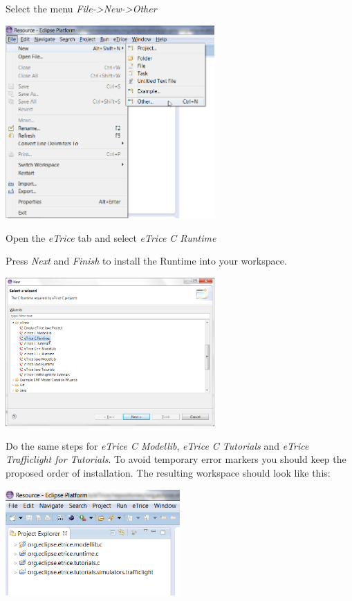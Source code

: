 Select the menu \emph{File->New->Other}

\includegraphics[width=0.6\textwidth]{images/013-SetupWorkspace02.png}

Open the \emph{eTrice} tab and select \textit{eTrice C Runtime}

Press \emph{Next} and \emph{Finish} to install the Runtime into your workspace.

\includegraphics[width=0.6\textwidth]{images/014-SetupWorkspaceC005.png}

Do the same steps for \textit{eTrice C Modellib}, \textit{eTrice C Tutorials} and \textit{eTrice Trafficlight for Tutorials}. To avoid temporary 
error markers you should keep the proposed order of installation. The resulting workspace should look like 
this:

\includegraphics[width=0.5\textwidth]{images/014-SetupWorkspace007.png}

